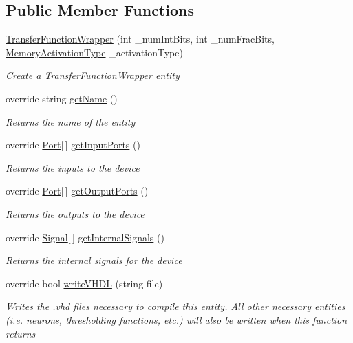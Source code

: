 \subsection*{Public Member Functions}
\begin{DoxyCompactItemize}
\item 
\hyperlink{class_n_n_gen_1_1_transfer_function_wrapper_a0d552d42c2b0d881b049d05c2fe7e3a9}{Transfer\+Function\+Wrapper} (int \+\_\+num\+Int\+Bits, int \+\_\+num\+Frac\+Bits, \hyperlink{class_n_n_gen_1_1_transfer_function_wrapper_aa338ffadb8fcdf76df75419374a51ff6}{Memory\+Activation\+Type} \+\_\+activation\+Type)
\begin{DoxyCompactList}\small\item\em Create a \hyperlink{class_n_n_gen_1_1_transfer_function_wrapper}{Transfer\+Function\+Wrapper} entity \end{DoxyCompactList}\item 
override string \hyperlink{class_n_n_gen_1_1_transfer_function_wrapper_a0ee97f1271edd325188fe389f1b25372}{get\+Name} ()
\begin{DoxyCompactList}\small\item\em Returns the name of the entity \end{DoxyCompactList}\item 
override \hyperlink{class_n_n_gen_1_1_port}{Port}\mbox{[}$\,$\mbox{]} \hyperlink{class_n_n_gen_1_1_transfer_function_wrapper_a383f86ef468440ca41a5018c8670c2ef}{get\+Input\+Ports} ()
\begin{DoxyCompactList}\small\item\em Returns the inputs to the device \end{DoxyCompactList}\item 
override \hyperlink{class_n_n_gen_1_1_port}{Port}\mbox{[}$\,$\mbox{]} \hyperlink{class_n_n_gen_1_1_transfer_function_wrapper_ae687574b26429fd7853a53df4759ca90}{get\+Output\+Ports} ()
\begin{DoxyCompactList}\small\item\em Returns the outputs to the device \end{DoxyCompactList}\item 
override \hyperlink{class_n_n_gen_1_1_signal}{Signal}\mbox{[}$\,$\mbox{]} \hyperlink{class_n_n_gen_1_1_transfer_function_wrapper_ae64279d96fae0f113bf6cf0cfbadfdff}{get\+Internal\+Signals} ()
\begin{DoxyCompactList}\small\item\em Returns the internal signals for the device \end{DoxyCompactList}\item 
override bool \hyperlink{class_n_n_gen_1_1_transfer_function_wrapper_a1c011e274cd2df8fc643228d77619890}{write\+V\+H\+D\+L} (string file)
\begin{DoxyCompactList}\small\item\em Writes the .vhd files necessary to compile this entity. All other necessary entities (i.\+e. neurons, thresholding functions, etc.) will also be written when this function returns \end{DoxyCompactList}\end{DoxyCompactItemize}

